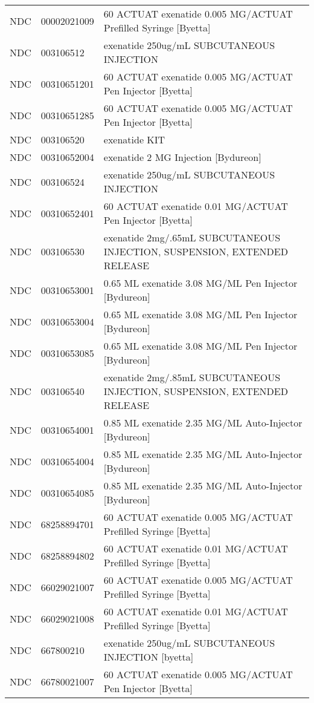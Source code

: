 \begin{longtable}{p{}p{}p{}}
  NDC & 00002021009 & 60 ACTUAT exenatide 0.005 MG/ACTUAT Prefilled Syringe [Byetta] \\ 
  NDC & 003106512 & exenatide 250ug/mL SUBCUTANEOUS INJECTION \\ 
  NDC & 00310651201 & 60 ACTUAT exenatide 0.005 MG/ACTUAT Pen Injector [Byetta] \\ 
  NDC & 00310651285 & 60 ACTUAT exenatide 0.005 MG/ACTUAT Pen Injector [Byetta] \\ 
  NDC & 003106520 & exenatide KIT \\ 
  NDC & 00310652004 & exenatide 2 MG Injection [Bydureon] \\ 
  NDC & 003106524 & exenatide 250ug/mL SUBCUTANEOUS INJECTION \\ 
  NDC & 00310652401 & 60 ACTUAT exenatide 0.01 MG/ACTUAT Pen Injector [Byetta] \\ 
  NDC & 003106530 & exenatide 2mg/.65mL SUBCUTANEOUS INJECTION, SUSPENSION, EXTENDED RELEASE \\ 
  NDC & 00310653001 & 0.65 ML exenatide 3.08 MG/ML Pen Injector [Bydureon] \\ 
  NDC & 00310653004 & 0.65 ML exenatide 3.08 MG/ML Pen Injector [Bydureon] \\ 
  NDC & 00310653085 & 0.65 ML exenatide 3.08 MG/ML Pen Injector [Bydureon] \\ 
  NDC & 003106540 & exenatide 2mg/.85mL SUBCUTANEOUS INJECTION, SUSPENSION, EXTENDED RELEASE \\ 
  NDC & 00310654001 & 0.85 ML exenatide 2.35 MG/ML Auto-Injector [Bydureon] \\ 
  NDC & 00310654004 & 0.85 ML exenatide 2.35 MG/ML Auto-Injector [Bydureon] \\ 
  NDC & 00310654085 & 0.85 ML exenatide 2.35 MG/ML Auto-Injector [Bydureon] \\ 
  NDC & 68258894701 & 60 ACTUAT exenatide 0.005 MG/ACTUAT Prefilled Syringe [Byetta] \\ 
  NDC & 68258894802 & 60 ACTUAT exenatide 0.01 MG/ACTUAT Prefilled Syringe [Byetta] \\ 
  NDC & 66029021007 & 60 ACTUAT exenatide 0.005 MG/ACTUAT Prefilled Syringe [Byetta] \\ 
  NDC & 66029021008 & 60 ACTUAT exenatide 0.01 MG/ACTUAT Prefilled Syringe [Byetta] \\ 
  NDC & 667800210 & exenatide 250ug/mL SUBCUTANEOUS INJECTION [byetta] \\ 
  NDC & 66780021007 & 60 ACTUAT exenatide 0.005 MG/ACTUAT Pen Injector [Byetta] \\ 

\end{longtable}
